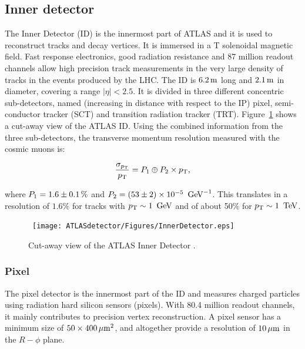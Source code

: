 \subsection{Inner detector}
    \label{subsec:InnerDetector}

The Inner Detector (ID) is the innermost part of ATLAS and it is used to reconstruct tracks and decay vertices.
It is immersed in a \unit[2]{T} solenoidal magnetic field.
Fast response electronics, good radiation resistance and 87 million readout channels allow high precision track measurements in the very large density of tracks in the events produced by the LHC.
The ID is $\unit[6.2]{m}$ long and $\unit[2.1]{m}$ in diameter, covering a range $|\eta|<2.5$. 
It is divided in three different concentric sub-detectors, named (increasing in distance with respect to the IP) pixel, semi-conductor tracker (SCT) and transition radiation tracker (TRT). Figure~\ref{fig:InnerDetector} shows a cut-away view of the ATLAS ID.
Using the combined information from the three sub-detectors, the transverse momentum resolution measured with the cosmic muons \cite{Aad:2010mr} is:

\begin{equation}
  \frac{\sigma_{\pt}}{\pt} = P_{1} \oplus P_{2} \times \pt, 
  \label{eq:IDresolution}
\end{equation}

\noindent where $P_{1} = \unit[1.6 \pm 0.1]{\%}$ and $P_{2} = \unit[(53 \pm 2)\times 10^{-5}]{\GeV^{-1}}$. This translates in a resolution of $1.6\%$ for tracks with $\pt\sim \unit[1]{\GeV}$ and of about 50\% for $\pt\sim \unit[1]{\TeV}$.

\begin{figure}[!ht]
  \begin{center}
    \mbox{
      \texttt{[image: ATLASdetector/Figures/InnerDetector.eps]}
    }
  \end{center}
  \caption[Cut-away view of the ATLAS Inner Detector.]{Cut-away view of the ATLAS Inner Detector \protect\cite{Evans:2008zzb}.}
  \label{fig:InnerDetector}
\end{figure}


\subsubsection{Pixel}
    \label{subsubsec:Pixel}

The pixel detector is the innermost part of the ID and measures charged particles using radiation hard silicon sensors (pixels).
With 80.4 million readout channels, it mainly contributes to precision vertex reconstruction.
A pixel sensor has a minimum size of $\unit[50 \times 400]{\mu m^2}$, and altogether provide a resolution of $\unit[10]{\mu m}$ in the $R-\phi$ plane.

